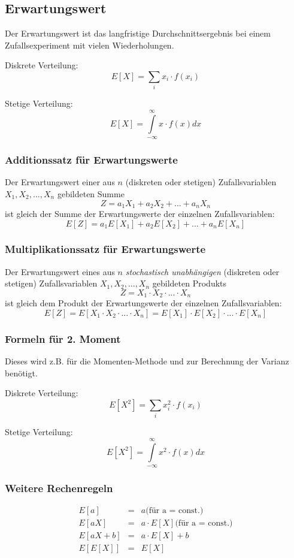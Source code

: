 \documentclass[10pt,a4paper,twocolumn]{article}
\begin{document}
\subsection{Erwartungswert}
Der Erwartungswert ist das langfristige Durchschnittsergebnis bei einem Zufallsexperiment mit vielen Wiederholungen.

\vspace{10pt}

Diskrete Verteilung:
\[
E[X]=\sum\limits_{i} x_i\cdot f(x_i)
\]

Stetige Verteilung:
\[
E[X]=\int\limits_{-\infty}^{\infty}x\cdot f(x)dx
\]

\subsubsection{Additionssatz für Erwartungswerte}
Der Erwartungswert einer aus $n$ (diskreten oder stetigen) Zufallsvariablen $X_1,X_2,...,X_n$ gebildeten Summe
\[
Z=a_1X_1+a_2X_2+...+a_nX_n
\]
ist gleich der Summe der Erwartungswerte der einzelnen Zufallsvariablen:
\[
E[Z]=a_1E[X_1]+a_2E[X_2]+...+a_nE[X_n]
\]

\subsubsection{Multiplikationssatz für Erwartungswerte}
Der Erwartungswert eines aus $n$ \emph{stochastisch unabhängigen} (diskreten oder stetigen) Zufallsvariablen $X_1,X_2,...,X_n$ gebildeten Produkts
\[
Z=X_1\cdot X_2\cdot ...\cdot X_n
\]
ist gleich dem Produkt der Erwartungswerte der einzelnen Zufallsvariablen:
\[
E[Z]=E[X_1\cdot X_2\cdot ...\cdot X_n]=E[X_1]\cdot E[X_2]\cdot ...\cdot E[X_n]
\]

\subsubsection{Formeln für 2. Moment}
Dieses wird z.B. für die Momenten-Methode und zur Berechnung der Varianz benötigt.

\vspace{10pt}

Diskrete Verteilung:
\[
E[X^2]=\sum\limits_{i} x_i^2\cdot f(x_i)
\]

Stetige Verteilung:
\[
E[X^2]=\int\limits_{-\infty}^{\infty}x^2\cdot f(x)dx
\]

\subsubsection{Weitere Rechenregeln}
\[
\begin{array}{rcl}
	E[a] & = & a \text{(für a = const.)} \\
	E[aX] & = & a \cdot E[X] \text{(für a = const.)} \\
	E[aX + b] & = & a \cdot E[X] + b \\	
	E[E[X]] & = & E[X] \\
\end{array}
\]
\end{document}
